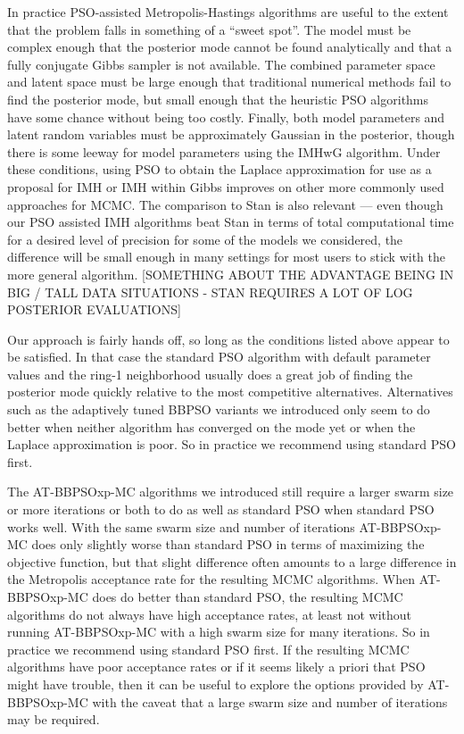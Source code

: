\documentclass[12pt]{article}
\begin{document}
In practice PSO-assisted Metropolis-Hastings algorithms are useful to the extent that the problem falls in something of a ``sweet spot''. The model must be complex enough that the posterior mode cannot be found analytically and that a fully conjugate Gibbs sampler is not available. The combined parameter space and latent space must be large enough that traditional numerical methods fail to find the posterior mode, but small enough that the heuristic PSO algorithms have some chance without being too costly. Finally, both model parameters and latent random variables must be approximately Gaussian in the posterior, though there is some leeway for model parameters using the IMHwG algorithm. Under these conditions, using PSO to obtain the Laplace approximation for use as a proposal for IMH or IMH within Gibbs improves on other more commonly used approaches for MCMC. The comparison to Stan is also relevant --- even though our PSO assisted IMH algorithms beat Stan in terms of total computational time for a desired level of precision for some of the models we considered, the difference will be small enough in many settings for most users to stick with the more general algorithm. [SOMETHING ABOUT THE ADVANTAGE BEING IN BIG / TALL DATA SITUATIONS - STAN REQUIRES A LOT OF LOG POSTERIOR EVALUATIONS]

Our approach is fairly hands off, so long as the conditions listed above appear to be satisfied. In that case the standard PSO algorithm with default parameter values and the ring-1 neighborhood usually does a great job of finding the posterior mode quickly relative to the most competitive alternatives. Alternatives such as the adaptively tuned BBPSO variants we introduced only seem to do better when neither algorithm has converged on the mode yet or when the Laplace approximation is poor. So in practice we recommend using standard PSO first.


 The AT-BBPSOxp-MC algorithms we introduced still require a larger swarm size or more iterations or both to do as well as standard PSO when standard PSO works well. With the same swarm size and number of iterations AT-BBPSOxp-MC does only slightly worse than standard PSO in terms of maximizing the objective function, but that slight difference often amounts to a large difference in the Metropolis acceptance rate for the resulting MCMC algorithms. When AT-BBPSOxp-MC does do better than standard PSO, the resulting MCMC algorithms do not always have high acceptance rates, at least not without running AT-BBPSOxp-MC with a high swarm size for many iterations. So in practice we recommend using standard PSO first. If the resulting MCMC algorithms have poor acceptance rates or if it seems likely a priori that PSO might have trouble, then it can be useful to explore the options provided by AT-BBPSOxp-MC with the caveat that a large swarm size and number of iterations may be required.
\end{document}
